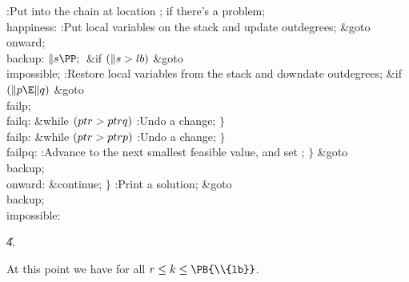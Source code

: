 :Put  into the chain at location ;  if there's a problem\X;\6
\4\\{happiness}:\5
:Put local variables on the stack and update outdegrees\X;\6
\&{goto} \\{onward};\6
\4\\{backup}:\5
${}\|s\PP;{}$\6
\&{if} ${}(\|s>\\{lb}){}$\1\5
\&{goto} \\{impossible};\2\6
:Restore local variables from the stack and downdate outdegrees\X;\6
\&{if} ${}(\|p\E\|q){}$\1\5
\&{goto} \\{failp};\2\6
\4\\{failq}:\5
\&{while} ${}(\\{ptr}>\\{ptrq}){}$\1\5
:Undo a change\X;\2\6
\4${}\}{}$\2\6
\4\\{failp}:\5
\&{while} ${}(\\{ptr}>\\{ptrp}){}$\1\5
:Undo a change\X;\2\6
\4${}\}{}$\2\6
\4\\{failpq}:\5
:Advance  to the next smallest feasible value, and set \X;\6
\4${}\}{}$\2\6
\&{goto} \\{backup};\6
\4\\{onward}:\5
\&{continue};\6
\4${}\}{}$\2\6
:Print a solution\X;\6
\&{goto} \\{backup};\6
\4\\{impossible}:\par
\U4.\fi

At this point we have  for all
$r\le k\le\PB{\\{lb}}$.


